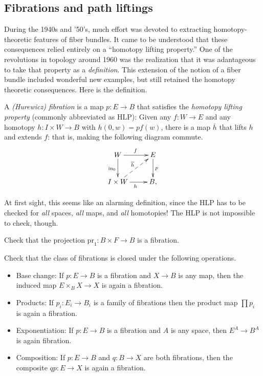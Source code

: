 \subsection{Fibrations and path liftings}
During the 1940s and '50's, much effort was devoted to extracting 
homotopy-theoretic features of fiber bundles. It came to be understood
that these consequences relied entirely on a ``homotopy lifting property.''
One of the revolutions in topology around 1960 was the realization that
it was adantageous to take that property as a {\em definition}.
This extension of the notion of a fiber bundle included 
wonderful new examples, but still retained the homotopy theoretic 
consequences. Here is the definition. 
\begin{definition}\label{fibration}
    A {\em (Hurewicz) fibration} is a map $p:E\to B$ that satisfies the
    \emph{homotopy lifting property} (commonly abbreviated as HLP):
Given any $f:W\to E$ and any homotopy $h:I\times W\to B$ with 
$h(0,w)=pf(w)$, there is a map $\overline{h}$ that lifts $h$ and extends $f$:
that is, making the following diagram commute. 
    \begin{equation}\label{hlp}
	\xymatrix{
	    W\ar[r]^f\ar[d]_{\mathrm{in}_0} & E\ar[d]^p\\
	    I\times W\ar[r]_h\ar@{-->}[ur]^{\overline{h}} & B,
	    }
    \end{equation}
\end{definition}
At first sight, this seems like an alarming definition, since
the HLP has to be checked for \emph{all} spaces, \emph{all} maps, and \emph{all} homotopies! 
The HLP is not impossible to check, though.

\begin{exercise}\label{productfibration}
    Check that the projection $\mathrm{pr}_1: B\times F\to B$ is a fibration.
\end{exercise}

\begin{exercise}
Check that the class of fibrations is closed under the following operations.
     \begin{itemize}
	\item Base change: If $p:E\to B$ is a fibration and $X\to B$ is any map, then the induced map $E\times_B X\to X$ is again a fibration.
	\item Products: If $p_i:E_i\to B_i$ 
is a family of fibrations then the product map $\prod p_i$ is again a 
fibration.
\item Exponentiation: If $p:E\to B$ is a fibration and $A$ is any space,
then $E^A\to B^A$ is again fibration.
	\item Composition: If $p:E\to B$ and $q:B\to X$ are both fibrations,
then the composite $qp:E\to X$ is again a fibration.
    \end{itemize}
\end{exercise}


